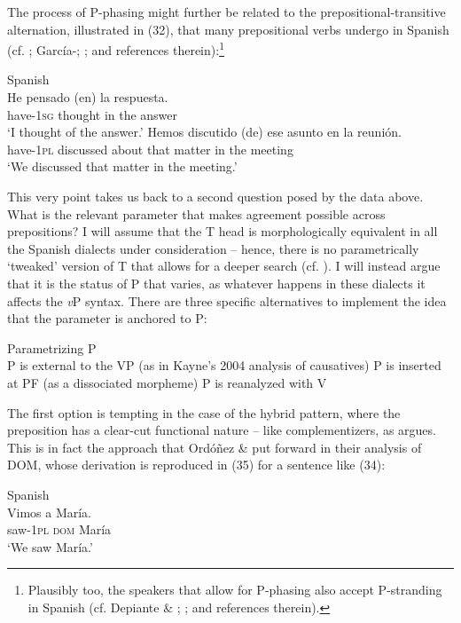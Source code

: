 \documentclass[output=paper]{langsci/langscibook}
\begin{document}
The process of P-phasing might further be related to the prepositional-transitive alternation, illustrated in (32), that many prepositional verbs undergo in Spanish (cf. \citealt{Demonte1991}; García-\citealt{Miguel1995}; \citealt{Gallego2010}; and references therein):\footnote{Plausibly too, the speakers that allow for P-phasing also accept P-stranding in Spanish (cf. Depiante \& \citealt{Thompson2013}; \citealt{Lemos2013}; and references therein).}

\ea%
    Spanish\label{ex:gallego:32}\\
    \ea
    \gll He             pensado (en) la     respuesta.        \\
         have{}-\textsc{1sg}  thought    in   the   answer\\
    \glt ‘I thought of the answer.’
    \ex
    \gll Hemos      discutido  (de)     ese  asunto  en  la   reunión.  \\
         have{}-\textsc{1pl}  discussed  about  that  matter  in  the meeting\\
    \glt ‘We discussed that matter in the meeting.’
    \z
\z

This very point takes us back to a second question posed by the data above. What is the relevant parameter that makes agreement possible across prepositions? I will assume that the T head is morphologically equivalent in all the Spanish dialects under consideration – hence, there is no parametrically ‘tweaked’ version of T that allows for a deeper search (cf. \citealt{Chomsky2001}). I will instead argue that it is the status of P that varies, as whatever happens in these dialects it affects the \textit{v}P syntax. There are three specific alternatives to implement the idea that the parameter is anchored to P:

\ea%
    Parametrizing P\label{ex:gallego:33}\\
    \ea P is external to the VP (as in Kayne’s 2004 analysis of causatives)
    \ex P is inserted at PF (as a dissociated morpheme)
    \ex P is reanalyzed with V
\z
\z

The first option is tempting in the case of the hybrid pattern, where the preposition has a clear-cut functional nature – like complementizers, as \citet{Kayne2004} argues. This is in fact the approach that Ordóñez \& \citet{Roca2017} put forward in their analysis of DOM, whose derivation is reproduced in (35) for a sentence like (34):

\ea%
    Spanish\label{ex:gallego:34}\\
    \gll   Vimos     a          María.\\
           saw{}-\textsc{1pl  dom}   María\\
    \glt   ‘We saw María.’
\z
  
\end{document}
